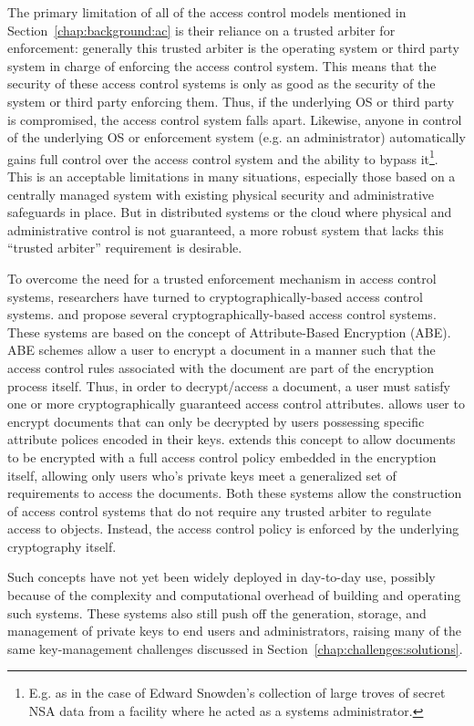 The primary limitation of all of the access control models mentioned
in Section~\ref{chap:background:ac} is their reliance on a trusted
arbiter for enforcement: generally this trusted arbiter is the
operating system or third party system in charge of enforcing the
access control system. This means that the security of these access
control systems is only as good as the security of the system or third
party enforcing them. Thus, if the underlying OS or third party is
compromised, the access control system falls apart. Likewise, anyone
in control of the underlying OS or enforcement system (e.g. an
administrator) automatically gains full control over the access
control system and the ability to bypass it\footnote{E.g. as in the
  case of Edward Snowden's collection of large troves of secret NSA
  data from a facility where he acted as a systems
  administrator.}. This is an acceptable limitations in many
situations, especially those based on a centrally managed system with
existing physical security and administrative safeguards in place. But
in distributed systems or the cloud where physical and administrative
control is not guaranteed, a more robust system that lacks this
``trusted arbiter'' requirement is desirable.

To overcome the need for a trusted enforcement mechanism in access
control systems, researchers have turned to cryptographically-based
access control systems. \cite{goyal2006} and \cite{bethencourt2007}
propose several cryptographically-based access control systems. These
systems are based on the concept of Attribute-Based Encryption
(ABE). ABE schemes allow a user to encrypt a document in a manner such
that the access control rules associated with the document are part of
the encryption process itself. Thus, in order to decrypt/access a
document, a user must satisfy one or more cryptographically guaranteed
access control attributes. \cite{goyal2006} allows user to encrypt
documents that can only be decrypted by users possessing specific
attribute polices encoded in their keys. \cite{bethencourt2007}
extends this concept to allow documents to be encrypted with a full
access control policy embedded in the encryption itself, allowing only
users who's private keys meet a generalized set of requirements to
access the documents. Both these systems allow the construction of
access control systems that do not require any trusted arbiter to
regulate access to objects. Instead, the access control policy is
enforced by the underlying cryptography itself.

Such concepts have not yet been widely deployed in day-to-day use,
possibly because of the complexity and computational overhead of
building and operating such systems. These systems also still push off
the generation, storage, and management of private keys to end users
and administrators, raising many of the same key-management challenges
discussed in Section~\ref{chap:challenges:solutions}.

